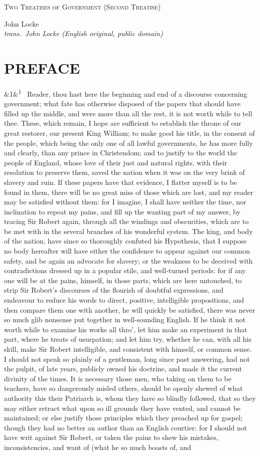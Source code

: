 \documentclass[12pt]{article}
\newcommand{\work}[1]{\begin{center}\LARGE\scshape #1\end{center}}
\newcommand{\attrib}[2]{\begin{center}\large #1\\[2pt]\small\itshape trans.\ #2\end{center}\vspace{1em}}
\newcommand{\para}[1][]{\par\noindent\ifx&#1&\else\textsuperscript{\footnotesize #1}~\fi}
\begin{document}
\work{Two Treatises of Government (Second Treatise)}
\attrib{John Locke}{John Locke (English original, public domain)}

\section*{PREFACE}

\para[1] Reader, thou hast here the beginning and end of a discourse concerning government; what fate has otherwise disposed of the papers that should have filled up the middle, and were more than all the rest, it is not worth while to tell thee. These, which remain, I hope are sufficient to establish the throne of our great restorer, our present King William; to make good his title, in the consent of the people, which being the only one of all lawful governments, he has more fully and clearly, than any prince in Christendom; and to justify to the world the people of England, whose love of their just and natural rights, with their resolution to preserve them, saved the nation when it was on the very brink of slavery and ruin. If these papers have that evidence, I flatter myself is to be found in them, there will be no great miss of those which are lost, and my reader may be satisfied without them: for I imagine, I shall have neither the time, nor inclination to repeat my pains, and fill up the wanting part of my answer, by tracing Sir Robert again, through all the windings and obscurities, which are to be met with in the several branches of his wonderful system. The king, and body of the nation, have since so thoroughly confuted his Hypothesis, that I suppose no body hereafter will have either the confidence to appear against our common safety, and be again an advocate for slavery; or the weakness to be deceived with contradictions dressed up in a popular stile, and well-turned periods: for if any one will be at the pains, himself, in those parts, which are here untouched, to strip Sir Robert's discourses of the flourish of doubtful expressions, and endeavour to reduce his words to direct, positive, intelligible propositions, and then compare them one with another, he will quickly be satisfied, there was never so much glib nonsense put together in well-sounding English. If he think it not worth while to examine his works all thro', let him make an experiment in that part, where he treats of usurpation; and let him try, whether he can, with all his skill, make Sir Robert intelligible, and consistent with himself, or common sense. I should not speak so plainly of a gentleman, long since past answering, had not the pulpit, of late years, publicly owned his doctrine, and made it the current divinity of the times. It is necessary those men, who taking on them to be teachers, have so dangerously misled others, should be openly shewed of what authority this their Patriarch is, whom they have so blindly followed, that so they may either retract what upon so ill grounds they have vented, and cannot be maintained; or else justify those principles which they preached up for gospel; though they had no better an author than an English courtier: for I should not have writ against Sir Robert, or taken the pains to shew his mistakes, inconsistencies, and want of (what he so much boasts of, and 
\end{document}
